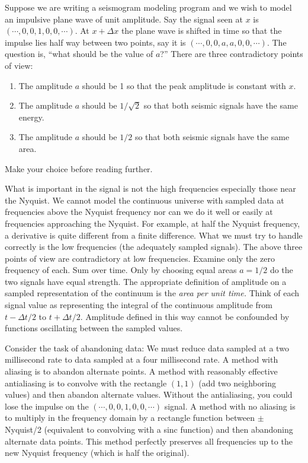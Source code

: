 \par
Suppose we are writing a seismogram modeling program
and we wish to model an impulsive plane wave of unit amplitude.
Say the signal seen at $x$ is 
$(\cdots,0, 0,1,0,0, \cdots )$.
At $x+\Delta x$ the plane wave is shifted in time
so that the impulse lies half way between two points,
say it is
$(\cdots,0, 0,a,a,0,0, \cdots )$.
The question is, ``what should be the value of $a$?''
There are three contradictory points of view:
\begin{enumerate}
\item The amplitude $a$ should be 1 so that the peak amplitude
	is constant with $x$.
\item The amplitude $a$ should be $1/\sqrt{2}$ so
	that both seismic signals have the same energy.
\item The amplitude $a$ should be $1/2$ so
	that both seismic signals have the same area.
\end{enumerate}
Make your choice before reading further.
\par
What is important
in the signal
is not the high frequencies
especially those near the Nyquist.
We cannot model the continuous universe with sampled data
at frequencies above the Nyquist frequency
nor can we do it well or easily
at frequencies approaching the Nyquist.
For example, at half the Nyquist frequency,
a derivative is quite different from a finite difference.
What we must try to handle correctly is the low frequencies
(the adequately sampled signals).
The above three points of view are contradictory at low frequencies.
Examine only the zero frequency of each.  Sum over time.
Only by choosing equal areas $a=1/2$ do the two signals have equal strength.
The appropriate definition of amplitude on
a sampled representation of the continuum is the {\em  area per unit time.}
Think of each signal value as representing the integral of
the continuous amplitude from
$t-\Delta t/2$ to
$t+\Delta t/2$.
Amplitude defined in this way cannot be confounded by
functions oscillating between the sampled values.
\par
Consider the task of abandoning data:
We must reduce data sampled at a two millisecond rate to data
sampled at a four millisecond rate.
A method with aliasing is to
abandon alternate points.
A method with reasonably effective antialiasing
is to convolve with the rectangle $(1,1)$
(add two neighboring values)
and then abandon alternate values.
Without the antialiasing,
you could lose the impulse on the
$(\cdots,0, 0,1,0,0, \cdots )$ signal.
A method with no aliasing is to multiply in the frequency domain
by a rectangle function between $\pm$ Nyquist/2
(equivalent to convolving with a sinc function)
and then abandoning alternate data points.
This method perfectly preserves all frequencies up to the
new Nyquist frequency (which is half the original).

